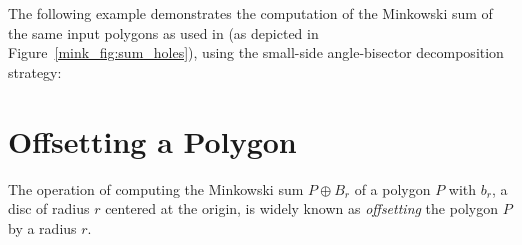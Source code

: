 The following example demonstrates the computation of the Minkowski sum
of the same input polygons as used in  (as
depicted in Figure~\ref{mink_fig:sum_holes}), using the small-side
angle-bisector decomposition strategy:


\section{Offsetting a Polygon\label{mink_sec:offset}}

The operation of computing the Minkowski sum $P \oplus B_r$ of a
polygon $P$ with $b_r$, a disc of radius $r$ centered at the origin,
is widely known as \emph{offsetting} the polygon $P$ by a radius $r$.

